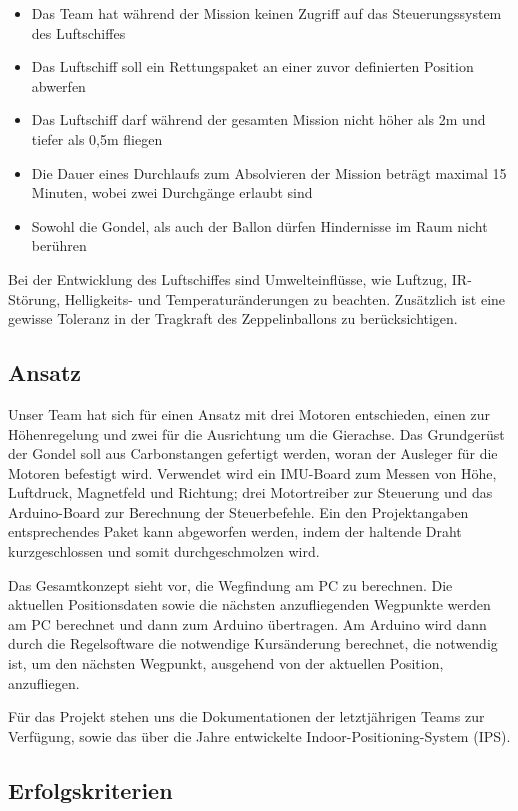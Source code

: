 \documentclass[lang=ngerman,inputenc=utf8,fontsize=10pt]{ldvarticle}
\begin{document}
\begin{itemize}
\item Das Team hat während der Mission keinen Zugriff auf das Steuerungssystem des Luftschiffes 
\item Das Luftschiff soll ein Rettungspaket an einer zuvor definierten Position abwerfen
\item Das Luftschiff darf während der gesamten Mission nicht höher als 2m und tiefer als 0,5m fliegen
\item Die Dauer eines Durchlaufs zum Absolvieren der Mission beträgt maximal 15 Minuten, wobei zwei Durchgänge erlaubt sind
\item Sowohl die Gondel, als auch der Ballon dürfen Hindernisse im Raum nicht berühren
\end{itemize}

Bei der Entwicklung des Luftschiffes sind Umwelteinflüsse, wie Luftzug, IR-Störung, Helligkeits- und Temperaturänderungen zu beachten. Zusätzlich ist eine gewisse Toleranz in der Tragkraft des Zeppelinballons zu berücksichtigen.

\subsection*{Ansatz}
Unser Team hat sich für einen Ansatz mit drei Motoren entschieden, einen zur Höhenregelung und zwei für die Ausrichtung um die Gierachse. Das Grundgerüst der Gondel soll aus Carbonstangen gefertigt werden, woran der Ausleger für die Motoren befestigt wird. Verwendet wird ein IMU-Board zum Messen von Höhe, Luftdruck, Magnetfeld und Richtung; drei Motortreiber zur Steuerung und das Arduino-Board zur Berechnung der Steuerbefehle. Ein den Projektangaben entsprechendes Paket kann abgeworfen werden,  indem der haltende Draht kurzgeschlossen und somit durchgeschmolzen wird.


Das Gesamtkonzept sieht vor, die Wegfindung am PC zu berechnen. Die aktuellen Positionsdaten sowie die nächsten anzufliegenden Wegpunkte werden am PC berechnet und dann zum Arduino übertragen. Am Arduino wird dann durch die Regelsoftware die notwendige Kursänderung berechnet, die notwendig ist, um den nächsten Wegpunkt, ausgehend von der aktuellen Position, anzufliegen.


Für das Projekt stehen uns die Dokumentationen der letztjährigen Teams zur Verfügung, sowie das über die Jahre entwickelte Indoor-Positioning-System (IPS).


\subsection*{Erfolgskriterien}
\end{document}
